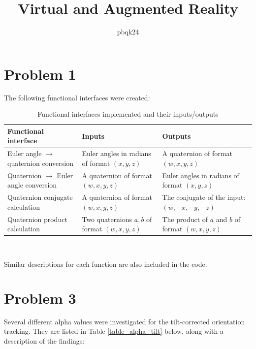 \documentclass[11pt,a4paper]{article}
\title{\vspace{-2em}Virtual and Augmented Reality}
\author{pbqk24}
\begin{document}
	\maketitle
	
	\vspace{-3em}
	
	\section*{Problem 1}	
	The following functional interfaces were created:
	
	\begin{table}[h!]
		\caption{Functional interfaces implemented and their inputs/outputs}
		\label{table_functional_interfaces}
		\begin{tabu} to 1.0\linewidth {|X[l]|X[l]|X[l]|}
			\hline
			\textbf{Functional interface}&\textbf{Inputs}&\textbf{Outputs}\\
			\hline
			Euler angle $\rightarrow$ quaternion conversion&Euler angles in radians of format $(x, y, z)$&A quaternion of format $(w, x, y, z)$\\
			\hline
			Quaternion $\rightarrow$ Euler angle conversion&A quaternion of format $(w, x, y, z)$&Euler angles in radians of format $(x, y, z)$\\
			\hline
			Quaternion conjugate calculation&A quaternion of format $(w, x, y, z)$& The conjugate of the input: $(w, -x, -y, -z)$\\
			\hline
			Quaternion product calculation&Two quaternions $a, b$ of format $(w, x, y, z)$&The product of $a$ and $b$ of format $(w, x, y, z)$\\
			\hline
		\end{tabu}\\
	\end{table}

	\noindent Similar descriptions for each function are also included in the code.
	
	\section*{Problem 3}
	
	Several different alpha values were investigated for the tilt-corrected orientation tracking. They are listed in Table \ref{table_alpha_tilt} below, along with a description of the findings:
	
\end{document}

